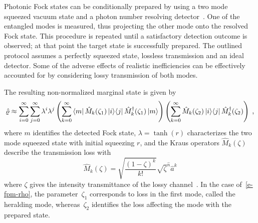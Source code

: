\documentclass{article}
\begin{document}
Photonic Fock states can be conditionally prepared by using a two mode squeezed vacuum state and a photon number resolving detector~\cite{yukawa2013a,yoshikawa2018,tiedau2019,provaznik2020}. One of the entangled modes is measured, thus projecting the other mode onto the resolved Fock state. This procedure is repeated until a satisfactory detection outcome is observed; at that point the target state is successfully prepared. The outlined protocol assumes a perfectly squeezed state, lossless transmission and an ideal detector. Some of the adverse effects of realistic inefficiencies can be effectively accounted for by considering lossy transmission of both modes. 

The resulting non-normalized marginal state is given by
%
\begin{equation}\label{e-fpm-rho}
  \hatrho \approx
  \sum_{i = 0}^{\infty} 
  \sum_{j = 0}^{\infty}
    \lambda^{i} \lambda^{j}
    \left(
      \sum_{k = 0}^{\infty}
        \bra{m} \hat{M}_{k} (\zeta_{1}) \ketbra{i}{j} \hat{M}_{k}^{\dagger} (\zeta_{1}) \ket{m}
    \right)
    \left(
      \sum_{k = 0}^{\infty}
        \hat{M}_{k}(\zeta_{2}) \ketbra{i}{j} \hat{M}_{k}^{\dagger} (\zeta_{2})
    \right) \Qc
\end{equation}
%
where $m$ identifies the detected Fock state, $\lambda = \tanh(r)$ characterizes the two mode squeezed state with initial squeezing $r$, and the Kraus operators $\hat{M}_{k} (\zeta) $ describe the transmission loss with
%
\begin{equation}
  \hat{M}_{k} (\zeta) =
    \sqrt{ \frac{(1 - \zeta)^{k}}{k!} } 
    \sqrt{\zeta}^{\hat{n}} \hat{a}^{k}
\end{equation}
%
where $\zeta$ gives the intensity transmittance of the lossy channel~\cite{ivan2011}. In the case of~\eqref{e-fpm-rho}, the parameter~$\zeta_{1}$ corresponds to loss in the first mode, called the heralding mode, whereas~$\zeta_{2}$ identifies the loss affecting the mode with the prepared state.
\end{document}
